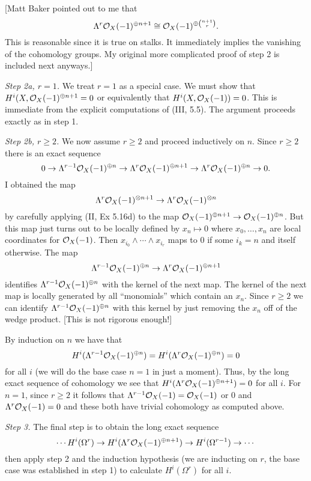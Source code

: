 \documentclass[12pt]{article}
\begin{document}
[Matt Baker pointed out to me that 
$$\Lambda^r\mathcal{O}_X(-1)^{\oplus n+1}\cong\mathcal{O}_X(-1)^{\oplus {{n+1} \choose {r}}}.$$
This is reasonable since it is true on stalks. It immediately implies
the vanishing of the cohomology groups. My original more complicated proof
of step 2 is included next anyways.]

{\em Step 2a, $r=1$.} We treat $r=1$ as a special case. 
We must show that $H^i(X,\mathcal{O}_X(-1)^{\oplus n+1}=0$ or 
equivalently that $H^i(X,\mathcal{O}_X(-1))=0$. This is immediate
from the explicit computations of (III, 5.5). The argument proceeds 
exactly as in step 1. 

{\em Step 2b, $r\geq 2$.} We now assume $r\geq 2$ and proceed inductively
on $n$. Since $r\geq 2$ there is an exact sequence
$$0\rightarrow\Lambda^{r-1}\mathcal{O}_X(-1)^{\oplus n}\rightarrow\Lambda^r\mathcal{O}_X(-1)^{\oplus n+1}\rightarrow\Lambda^r\mathcal{O}_X(-1)^{\oplus n}\rightarrow 0.$$
I obtained the map 
$$\Lambda^r\mathcal{O}_X(-1)^{\otimes n+1}\rightarrow\Lambda^r\mathcal{O}_X(-1)^{\otimes n}$$
by carefully applying (II, Ex 5.16d) to the map
$\mathcal{O}_X(-1)^{\oplus n+1}\rightarrow\mathcal{O}_X(-1)^{\oplus n}$. 
But this map just turns out to be locally defined by
$x_n\mapsto 0$ where $x_0,\ldots,x_n$ are local coordinates
for $\mathcal{O}_X(-1)$. Then $x_{i_0}\wedge\cdots\wedge x_{i_r}$ 
maps to $0$ if some $i_k=n$ and itself otherwise. 
The map 
$$\Lambda^{r-1}\mathcal{O}_X(-1)^{\oplus n}\rightarrow\Lambda^r\mathcal{O}_X(-1)^{\oplus n+1}$$
identifies $\Lambda^{r-1}\mathcal{O}_X(-1)^{\oplus n}$ with the kernel of the
next map. The kernel of the next map is locally generated by all  
``monomials'' which contain an $x_n$. Since $r\geq 2$ we can identify
$\Lambda^{r-1}\mathcal{O}_X(-1)^{\oplus n}$ with this kernel by just removing
the $x_n$ off of the wedge product. 
[This is not rigorous enough!]

By induction on $n$ we have that
$$H^i(\Lambda^{r-1}\mathcal{O}_X(-1)^{\oplus n})=H^i(\Lambda^r\mathcal{O}_X(-1)^{\oplus n})=0$$ 
for all $i$ (we will do the base case $n=1$ in just a moment). 
Thus, by the long exact sequence of cohomology we see that 
$H^i(\Lambda^r\mathcal{O}_X(-1)^{\oplus n+1})=0$ for all $i$. 
For $n=1$, since $r\geq 2$
it follows that  $\Lambda^{r-1}\mathcal{O}_X(-1)=\mathcal{O}_X(-1)$ or $0$
and $\Lambda^r\mathcal{O}_X(-1)=0$ and these both have trivial cohomology
as computed above. 

{\em Step 3.} The final step is to obtain the long exact sequence
$$\cdots H^i(\Omega^r)\rightarrow H^i(\Lambda^r\mathcal{O}_X(-1)^{\oplus n+1})\rightarrow H^i(\Omega^{r-1})\rightarrow \cdots$$ 
then apply step 2 and the induction hypothesis (we are inducting
on $r$, the base case was established in step 1) to 
calculate $H^i(\Omega^r)$ for all $i$. 
\end{document}

